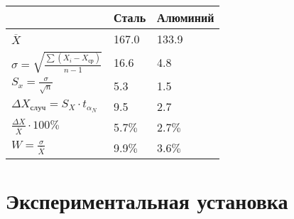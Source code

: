 \documentclass[12pt, a4paper]{article}
\begin{document}
     
     \begin{table}[h]
     \centering
     	\begin{tabular}{|M{3cm}|M{3cm}|M{3cm}|}
     	\hline
     	& Сталь & Алюминий \\
     	\hline
      	$\overline{X}$  & 167.0 & 133.9 \\
     	$\sigma = \sqrt{\frac{\sum(X_{i} - X_{ср})}{n - 1}}$ & 16.6 & 4.8 \\
     	$S_{x} = \frac{\sigma}{\sqrt{n}}$                    & 5.3 & 1.5 \\
     	$\Delta X_{случ} = S_{X}\cdot t_{\alpha_{N}}$          & 9.5 & 2.7 \\
     	$\frac{\Delta X}{\overline{X}}\cdot 100\%$           & 5.7$\%$ & 2.7$\%$ \\
     	$W = \frac{\sigma}{\overline{X}}$                    & 9.9$\%$ & 3.6$\%$ \\
     	                    
     	\hline
     	\end{tabular}
     \end{table}
     
    \newpage
    
    \section{Экспериментальная установка}
    

    \newpage
    
    
\end{document}
